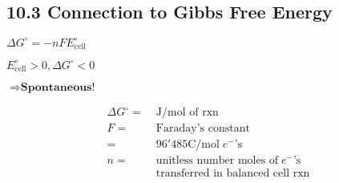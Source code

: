 \subsection{10.3 Connection to Gibbs Free Energy}
\vspace*{-0.5em}
    \begin{minipage}{0.99\linewidth}
        \begin{minipage}{0.35\linewidth}
            \centerline{$\Delta G^\circ = -n F E^\circ_\text{cell}$}
            \vspace*{2em}
            \centerline{$E^\circ_\text{cell} > 0, \Delta G^\circ < 0$}
            \vspace*{0.5em}
            \centerline{$\Rightarrow \textbf{Spontaneous!}$}
        \end{minipage}
        \begin{minipage}{0.7\linewidth}
            \begin{align*}
                \Delta G^\circ =& \; \textrm{J/mol of rxn}\\
                F =& \; \textrm{Faraday's constant}\\
                =& \; 96'485 \textrm{C/mol} \; e^- \textrm{'s}\\
                n =& \; \textrm{unitless number moles of} \; e^- \textrm{'s}\\
                & \; \textrm{transferred in balanced cell rxn}\\
            \end{align*}
        \end{minipage}
    \end{minipage}